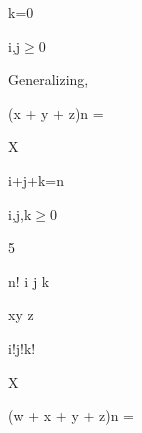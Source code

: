 \documentclass[a4paper,portrait,12pt]{article}
\begin{document}
\begin{flushleft}
k=0
\end{flushleft}





\begin{flushleft}
i,j$\geq$0
\end{flushleft}





\begin{flushleft}
Generalizing,
\end{flushleft}


\begin{flushleft}
(x + y + z)n =
\end{flushleft}





\begin{flushleft}
X
\end{flushleft}


\begin{flushleft}
i+j+k=n
\end{flushleft}


\begin{flushleft}
i,j,k$\geq$0
\end{flushleft}





5





\begin{flushleft}
n! i j k
\end{flushleft}


\begin{flushleft}
xy z
\end{flushleft}


\begin{flushleft}
i!j!k!
\end{flushleft}





\begin{flushleft}
\newpage
X
\end{flushleft}





\begin{flushleft}
(w + x + y + z)n =
\end{flushleft}
\end{document}
